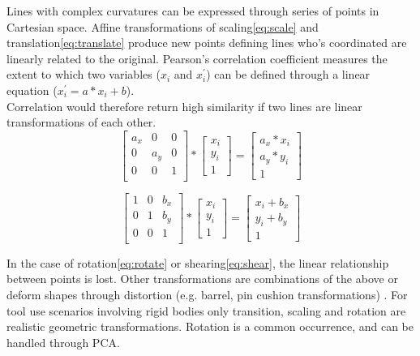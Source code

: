 \documentclass[11]{article}
\begin{document}
Lines with complex curvatures can be expressed through series of points in Cartesian space. 
Affine transformations of scaling\eqref{eq:scale} and translation\eqref{eq:translate} produce new points defining lines who's coordinated are linearly related to the original. 
Pearson's correlation coefficient measures the extent to which two variables ($x_i$ and $x_i^\prime$) can be defined through a linear equation ($x_i^\prime = a * x_i + b$). \\
Correlation would therefore return high similarity if two lines are linear transformations of each other.    
\begin{equation}
  \begin{bmatrix}
    a_x & 0   & 0   \\
    0   & a_y & 0   \\
    0   & 0   &   1 \\ 
  \end{bmatrix} 
  *
  \begin{bmatrix}
    x_i \\ y_i \\ 1
  \end{bmatrix} 
  = 
  \begin{bmatrix}
    a_x * x_i \\ a_y * y_i \\ 1  
  \end{bmatrix}
  \label{eq:scale}
\end{equation}


\begin{equation}
  \begin{bmatrix}
    1 & 0 & b_x \\
    0 & 1 & b_y \\
    0 & 0 & 1   \\ 
  \end{bmatrix} 
  *
  \begin{bmatrix}
    x_i \\ y_i \\ 1
  \end{bmatrix} 
  = 
  \begin{bmatrix}
    x_i + b_x \\ y_i + b_y \\ 1  
  \end{bmatrix}
  \label{eq:translate}
\end{equation}

In the case of rotation\eqref{eq:rotate} or shearing\eqref{eq:shear}, the linear relationship between points is lost. 
Other transformations are combinations of  the above or deform shapes through distortion (e.g. barrel, pin cushion transformations) . 
For tool use scenarios involving rigid bodies only transition, scaling and rotation are realistic geometric transformations. 
Rotation is a common occurrence, and can be handled through PCA. 
\end{document}

